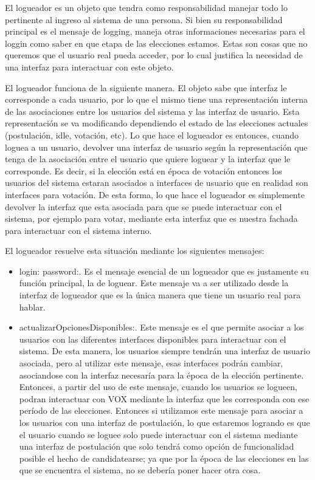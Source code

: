 El logueador es un objeto que tendra como responsabilidad manejar todo lo pertinente al ingreso al sistema de una persona. Si bien su responsabilidad principal es el mensaje de logging, maneja otras informaciones necesarias para el loggin como saber en que etapa de las elecciones estamos. Estas son cosas que no queremos que el usuario real pueda acceder, por lo cual justifica la necesidad de una interfaz para interactuar con este objeto.

El logueador funciona de la siguiente manera. El objeto sabe que interfaz le corresponde a cada usuario, por lo que el mismo tiene una representaci\'on interna de las asociaciones entre los usuarios del sistema y las interfaz de usuario. Esta representaci\'on se va modificando dependiendo el estado de las elecciones actuales (postulaci\'on, idle, votaci\'on, etc).
Lo que hace el logueador es entonces, cuando loguea a un usuario, devolver una interfaz de usuario seg\'un la representaci\'on que tenga de la asociaci\'on entre el usuario que quiere loguear y la interfaz que le corresponde. Es decir, si la elecci\'on est\'a en \'epoca de votaci\'on entonces los usuarios del sistema estaran asociados a interfaces de usuario que en realidad son interfaces para votaci\'on. De esta forma, lo que hace el logueador es simplemente devolver la interfaz que esta asociada para que se puede interactuar con el sistema, por ejemplo para votar, mediante esta interfaz que es nuestra fachada para interactuar con el sistema interno.

El logueador resuelve esta situaci\'on mediante los siguientes mensajes:

\begin{itemize}
\item login: password:. Es el mensaje esencial de un logueador que es justamente su funci\'on principal, la de loguear. Este mensaje va a ser utilizado desde la interfaz de logueador que es la \'unica manera que tiene un usuario real para hablar.
\item actualizarOpcionesDisponibles:. Este mensaje es el que permite asociar a los usuarios con las diferentes interfaces disponibles para interactuar con el sistema. De esta manera, los usuarios siempre tendr\'an una interfaz de usuario asociada, pero al utilizar este mensaje, esas interfaces podr\'an cambiar, asociandose con la interfaz necesar\'ia para la \'epoca de la elecci\'on pertinente. Entonces, a partir del uso de este mensaje, cuando los usuarios se logueen, podran interactuar con VOX mediante la interfaz que les corresponda con ese per\'iodo de las elecciones. Entonces si utilizamos este mensaje para asociar a los usuarios con una interfaz de postulaci\'on, lo que estaremos logrando es que el usuario cuando se loguee solo puede interactuar con el sistema mediante una interfaz de postulaci\'on que solo tendr\'a como opci\'on de funcionalidad posible el hecho de candidatearse; ya que por la \'epoca de las elecciones en las que se encuentra el sistema, no se deber\'ia poner hacer otra cosa.
\end{itemize}


